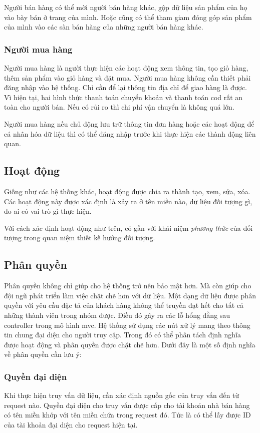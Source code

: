 	Người bán hàng có thể mời người bán hàng khác, gộp dữ liệu sản phẩm của họ vào bày bán ở trang của mình. Hoặc cũng có thể tham giam đóng góp sản phẩm của mình vào các sàn bán hàng của những người bán hàng khác.
	
	\subsubsection{Người mua hàng}
	Người mua hàng là người thực hiện các hoạt động xem thông tin, tạo giỏ hàng, thêm sản phẩm vào giỏ hàng và đặt mua. Người mua hàng không cần thiết phải đăng nhập vào hệ thống. Chỉ cần để lại thông tin địa chỉ để giao hàng là được. Vì hiện tại, hai hình thức thanh toán chuyển khoản và thanh toán \acrshort{cod} rất an toàn cho người bán. Nếu có rủi ro thì chi phí vận chuyển là không quá lớn.
	
	Người mua hàng nếu chủ động lưu trữ thông tin đơn hàng hoặc các hoạt động để cá nhân hóa dữ liệu thì có thể đăng nhập trước khi thực hiện các thành động liên quan.
	
	\subsection{Hoạt động}
	Giống như các hệ thống khác, hoạt động được chia ra thành tạo, xem, sửa, xóa. Các hoạt động này được xác định là xảy ra ở tên miền nào, dữ liệu đối tượng gì, do ai có vai trò gì thực hiện.
	
	Với cách xác định hoạt động như trên, có gần với khái niệm \emph{phương thức} của đối tượng trong quan niệm thiết kế hướng đối tượng.
	
	\subsection{Phân quyền}
	
	Phân quyền không chỉ giúp cho hệ thống trở nên bảo mật hơn. Mà còn giúp cho đội ngũ phát triển làm việc chặt chẽ hơn với dữ liệu. Một dạng dữ liệu được phân quyền với yêu cầu đặc tả của khách hàng không thể truyền đạt hết cho tất cả những thành viên trong nhóm được. Điều đó gây ra các lỗ hổng đằng sau \gls{controller} trong mô hình \acrshort{mvc}. Hệ thống sử dụng các nút xử lý mang theo thông tin chung đại diện cho người truy cập. Trong đó có thể phân tách định nghĩa được hoạt động và phân quyền được chặt chẽ hơn. Dưới đây là một số định nghĩa về phân quyền cần lưu ý:
	
	\subsubsection{Quyền đại diện}\label{what-is-owner}
	Khi thực hiện truy vấn dữ liệu, cần xác định nguồn gốc của truy vấn đến từ \gls{request} \cite{http} nào. Quyền đại diện cho truy vấn được cấp cho tài khoản nhà bán hàng có tên miền khớp với tên miền chứa trong \gls{request} đó. Tức là có thể lấy được ID của tài khoản đại diện cho \gls{request} hiện tại. 
	
